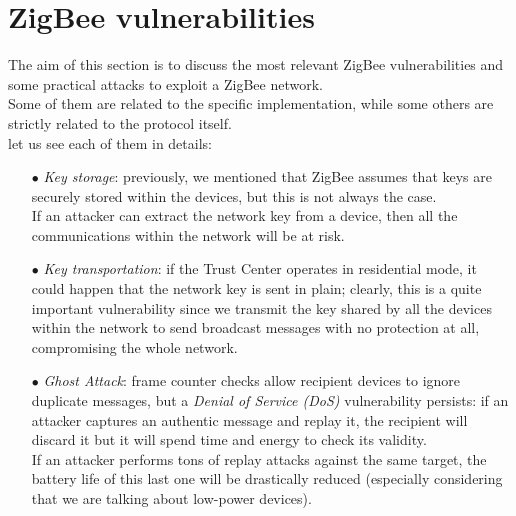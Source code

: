 \documentclass[12pt]{report}
\begin{document}


\clearpage
\section{ZigBee vulnerabilities}
\label{sec:zigbeevulns}
\bigskip
The aim of this section is to discuss the most relevant ZigBee vulnerabilities and some practical attacks to exploit a ZigBee network.\\
Some of them are related to the specific implementation, while some others are strictly related to the protocol itself.\\
let us see each of them in details:

\begin{itemize}
\setlength{\itemindent}{+4mm}
\item[$\bullet$] \emph{Key storage}: previously, we mentioned that ZigBee assumes that keys are securely stored within the devices, but this is not always the case.\\
If an attacker can extract the network key from a device, then all the communications within the network will be at risk.

\item[$\bullet$] \emph{Key transportation}: if the Trust Center operates in residential mode, it could happen that the network key is sent in plain; clearly, this is a quite important vulnerability since we transmit the key shared by all the devices within the network to send broadcast messages with no protection at all, compromising the whole network.

\item[$\bullet$] \emph{Ghost Attack}: frame counter checks allow recipient devices to ignore duplicate messages, but a \emph{Denial of Service (DoS)} vulnerability persists: if an attacker captures an authentic message and replay it, the recipient will discard it but it will spend time and energy to check its validity.\\
If an attacker performs tons of replay attacks against the same target, the battery life of this last one will be drastically reduced (especially considering that we are talking about low-power devices).

\end{itemize}
\end{document}

